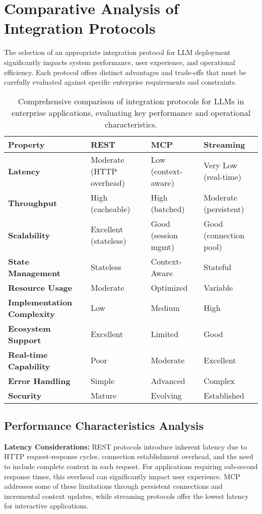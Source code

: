 \section{Comparative Analysis of Integration Protocols}

The selection of an appropriate integration protocol for LLM deployment significantly impacts system performance, user experience, and operational efficiency. Each protocol offers distinct advantages and trade-offs that must be carefully evaluated against specific enterprise requirements and constraints.

\begin{table}[H]
\centering
\small
\begin{tabular}{@{}p{3.5cm}|p{3.5cm}p{3.5cm}p{3.5cm}@{}}
\toprule
\textbf{Property} & \textbf{REST} & \textbf{MCP} & \textbf{Streaming} \\
\midrule
\textbf{Latency} & Moderate (HTTP overhead) & Low (context-aware) & Very Low (real-time) \\
\textbf{Throughput} & High (cacheable) & High (batched) & Moderate (persistent) \\
\textbf{Scalability} & Excellent (stateless) & Good (session mgmt) & Good (connection pool) \\
\textbf{State Management} & Stateless & Context-Aware & Stateful \\
\textbf{Resource Usage} & Moderate & Optimized & Variable \\
\textbf{Implementation Complexity} & Low & Medium & High \\
\textbf{Ecosystem Support} & Excellent & Limited & Good \\
\textbf{Real-time Capability} & Poor & Moderate & Excellent \\
\textbf{Error Handling} & Simple & Advanced & Complex \\
\textbf{Security} & Mature & Evolving & Established \\
\bottomrule
\end{tabular}
\caption{Comprehensive comparison of integration protocols for LLMs in enterprise applications, evaluating key performance and operational characteristics.}
\label{tab:protocol_comparison}
\end{table}

\subsection{Performance Characteristics Analysis}

\textbf{Latency Considerations:}
REST protocols introduce inherent latency due to HTTP request-response cycles, connection establishment overhead, and the need to include complete context in each request. For applications requiring sub-second response times, this overhead can significantly impact user experience. MCP addresses some of these limitations through persistent connections and incremental context updates, while streaming protocols offer the lowest latency for interactive applications.


